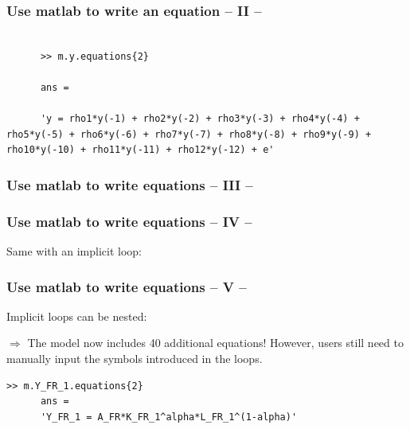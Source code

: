 \documentclass[10pt,slidestop]{beamer}
\theoremstyle{plain}
\begin{document}
\begin{frame}[c,fragile]
  \frametitle{Use matlab to write an equation -- II --}

  

  \bigskip

  \begin{lstlisting}[style=MatlabConsole]

      >> m.y.equations{2}

      ans =

      'y = rho1*y(-1) + rho2*y(-2) + rho3*y(-3) + rho4*y(-4) + rho5*y(-5) + rho6*y(-6) + rho7*y(-7) + rho8*y(-8) + rho9*y(-9) + rho10*y(-10) + rho11*y(-11) + rho12*y(-12) + e'
  \end{lstlisting}

\end{frame}


\begin{frame}[c,fragile]
  \frametitle{Use matlab to write equations -- III --}

  

\end{frame}


\begin{frame}[c,fragile]
  \frametitle{Use matlab to write equations -- IV --}

  Same with an implicit loop:

  \bigskip

  

\end{frame}


\begin{frame}[c,fragile]
  \frametitle{Use matlab to write equations -- V --}

  Implicit loops can be nested:

  \bigskip

  

  $\Rightarrow$ The model now includes 40 additional equations! However, users still need to manually input the symbols introduced in the loops.\newline

  \begin{lstlisting}[style=MatlabConsole]
      >> m.Y_FR_1.equations{2}
      ans =
      'Y_FR_1 = A_FR*K_FR_1^alpha*L_FR_1^(1-alpha)'
  \end{lstlisting}

\end{frame}
\end{document}
